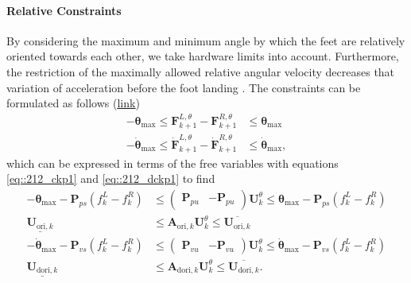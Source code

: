 \paragraph{Relative Constraints}
By considering the maximum and minimum angle by which the feet are relatively oriented towards each other, we take hardware limits into account. Furthermore, the restriction of the maximally allowed relative angular velocity decreases that variation of acceleration before the foot landing \cite{naveau2016reactive}. The constraints can be formulated as follows (\href{https://github.com/mhubii/nmpc_pattern_generator/blob/dc1f5a9366cbbbf76f1b02cada642f6ac9a04c89/libs/pattern_generator/src/base_generator.cpp#L1244}{\underline{link}})
\begin{align}
	-\bm{\theta}_\text{max}\leq\bm{F}_{k+1}^{L,\theta} - \bm{F}_{k+1}^{R,\theta} &\leq \bm{\theta}_\text{max} \\
	-\dot{\bm{\theta}}_\text{max}\leq\dot{\bm{F}}_{k+1}^{L,\theta} - \dot{\bm{F}}_{k+1}^{R,\theta} &\leq \dot{\bm{\theta}}_\text{max},
\end{align}
which can be expressed in terms of the free variables with equations \ref{eq::212_ckp1} and \ref{eq::212_dckp1} to find
\begin{align}
	-\bm{\theta}_\text{max}-\bm{P}_{ps}(f_k^L-f_k^R)&\leq \begin{pmatrix}
	\bm{P}_{pu} & -\bm{P}_{pu}
	\end{pmatrix}\bm{U}_k^\theta \leq \bm{\theta}_\text{max}-\bm{P}_{ps}(f_k^L-f_k^R) \\
	\underline{\bm{U}_{\text{ori},k}}&\leq \bm{A}_{\text{ori},k}\bm{U}_k^\theta \leq \overline{\bm{U}_{\text{ori},k}}\\
		-\dot{\bm{\theta}}_\text{max}-\bm{P}_{vs}(f_k^L-f_k^R)&\leq \begin{pmatrix}
	\bm{P}_{vu} & -\bm{P}_{vu}
	\end{pmatrix}\bm{U}_k^\theta \leq \dot{\bm{\theta}}_\text{max}-\bm{P}_{vs}(f_k^L-f_k^R)\\
	\underline{\bm{U}_{\text{dori},k}}&\leq \bm{A}_{\text{dori},k}\bm{U}_k^\theta \leq \overline{\bm{U}_{\text{dori},k}}.
\end{align}
